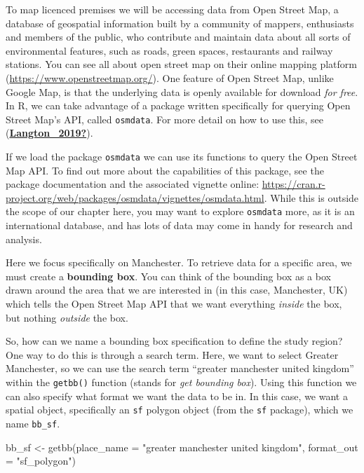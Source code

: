 \documentclass[
]{book}
\makeatletter
\newenvironment{Shaded}{\begin{snugshade}}{\end{snugshade}}
\newcommand{\AttributeTok}[1]{\textcolor[rgb]{0.61,0.61,0.61}{#1}}
\newcommand{\FunctionTok}[1]{\textcolor[rgb]{0,0,0}{#1}}
\newcommand{\NormalTok}[1]{#1}
\newcommand{\OtherTok}[1]{\textcolor[rgb]{0.37,0.37,0.37}{#1}}
\newcommand{\StringTok}[1]{\textcolor[rgb]{0.5,0.5,0.5}{#1}}
\newenvironment{kframe}{%
\medskip{}
\setlength{\fboxsep}{.8em}
 \def\at@end@of@kframe{}%
 \ifinner\ifhmode%
  \def\at@end@of@kframe{\end{minipage}}%
  \begin{minipage}{\columnwidth}%
 \fi\fi%
 \def\FrameCommand##1{\hskip\@totalleftmargin \hskip-\fboxsep
 \colorbox{shadecolor}{##1}\hskip-\fboxsep
     \hskip-\linewidth \hskip-\@totalleftmargin \hskip\columnwidth}%
 \MakeFramed {\advance\hsize-\width
   \@totalleftmargin\z@ \linewidth\hsize
   \@setminipage}}%
 {\par\unskip\endMakeFramed%
 \at@end@of@kframe}
\renewenvironment{Shaded}{\begin{kframe}}{\end{kframe}}
\makeatother
\begin{document}
To map licenced premises we will be accessing data from Open Street Map, a database of geospatial information built by a community of mappers, enthusiasts and members of the public, who contribute and maintain data about all sorts of environmental features, such as roads, green spaces, restaurants and railway stations. You can see all about open street map on their online mapping platform (\url{https://www.openstreetmap.org/}). One feature of Open Street Map, unlike Google Map, is that the underlying data is openly available for download \emph{for free}. In R, we can take advantage of a package written specifically for querying Open Street Map's API, called \texttt{osmdata}. For more detail on how to use this, see (\protect\hyperlink{ref-Langton_2019}{\textbf{Langton\_2019?}}).

If we load the package \texttt{osmdata} we can use its functions to query the Open Street Map API. To find out more about the capabilities of this package, see the package documentation and the associated vignette online: \url{https://cran.r-project.org/web/packages/osmdata/vignettes/osmdata.html}. While this is outside the scope of our chapter here, you may want to explore \texttt{osmdata} more, as it is an international database, and has lots of data may come in handy for research and analysis.

Here we focus specifically on Manchester. To retrieve data for a specific area, we must create a \textbf{bounding box}. You can think of the bounding box as a box drawn around the area that we are interested in (in this case, Manchester, UK) which tells the Open Street Map API that we want everything \emph{inside} the box, but nothing \emph{outside} the box.

So, how can we name a bounding box specification to define the study region? One way to do this is through a search term. Here, we want to select Greater Manchester, so we can use the search term ``greater manchester united kingdom'' within the \texttt{getbb()} function (stands for \emph{get bounding box}). Using this function we can also specify what format we want the data to be in. In this case, we want a spatial object, specifically an \texttt{sf} polygon object (from the \texttt{sf} package), which we name \texttt{bb\_sf}.

\begin{Shaded}
\begin{Highlighting}[]
\NormalTok{bb\_sf }\OtherTok{\textless{}{-}} \FunctionTok{getbb}\NormalTok{(}\AttributeTok{place\_name =} \StringTok{"greater manchester united kingdom"}\NormalTok{, }
               \AttributeTok{format\_out =} \StringTok{"sf\_polygon"}\NormalTok{)}
\end{Highlighting}
\end{Shaded}
\end{document}
